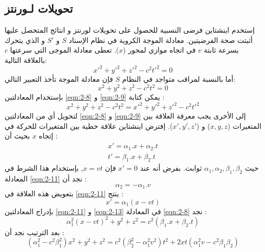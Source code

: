 \subsection{تحويلات لـورنتز}
إستخدم اينشتاين فرضى النسبية للحصول على تحويلات لورنتز و انتائج المتحصل عليها أثبتت صحة الفرضيتين. معادلة الموجة الكروية في نظام الإسناد $S$ و $S'$ و الذي يتحرك بسرعة ثابتة $v$ في اتجاه موازي لمحور ($x$). تعطى معادلة الموجى التي سرعتها $c$ بالعلاقة التالية:
 \begin{equation}
 	\label{eqn:2-8}
 	x'^{2} + y'^{2} + z'^{2} - c^{2}t'^{2}=0
 \end{equation}
 أما بالنسبة لمراقب متواجد في النظام  $S$ فإن معادلة الموجة تأخذ التعبير التالي:
  \begin{equation}
  	\label{eqn:2-9}
 	x^{2} + y^{2} + z^{2} - c^{2}t^{2}=0
 \end{equation}
بإستخدام المعادلتين  \eqref{eqn:2-8} و  \eqref{eqn:2-9}  يمكن كتابة :
 \begin{equation}
 	\label{eqn:2-10}
 	x^{2} + y^{2} + z^{2} - c^{2}t^{2}= x'^{2} + y'^{2} + z'^{2} - c^{2}t'^{2}
 \end{equation}
 لتحويل أي من المعادلتين  \eqref{eqn:2-8} و  \eqref{eqn:2-9}  إلى الأخرى يجب معرفة العلاقة بين المتغيرات ($x, y, z$) و ($x', y', z'$). إفترض اينشتاين علاقة خطية بين المتغيرات للحركة في إتجاه  $x$ بحيث أن : 
\begin{equation}
	\label{eqn:2-11}
	\begin{array}{ccl}
	x' = \alpha_{1}.x + \alpha_{2}.t \\
	t' = \beta_{1}.x + \beta_{2}.t	
\end{array}
 \end{equation}
 حيث $\alpha_{1}, \alpha_{2}, \beta_{1}, \beta_{2}$ ثوابت. 
بفرض أنه عند $x'=0$ فإن $x=vt$, بإستخدام هذا الشرط في المعادلة \eqref{eqn:2-11} نجد أن :
\begin{equation}
		\label{eqn:2-12}
	\alpha_{2} = - \alpha_{1}.v
\end{equation}
بتعويض هذه العلاقة في
\eqref{eqn:2-11} 
ينتج : 
\begin{equation}
	\label{eqn:2-13}
	x' = \alpha_{1} (x-vt)
\end{equation}
بإدراج المعادلتين 
\eqref{eqn:2-11} و \eqref{eqn:2-13} في المعادلة \eqref{eqn:2-8} نجد :
\begin{equation*}
\alpha_{1}^{2}(x-vt)^{2} + y^{2}+ z^{2} = c^{2}(\beta_{1}.x + \beta_{2}.t)
\end{equation*}
بعد الترتيب نجد أن :
\begin{equation}
	\label{eqn:2-14}
	(\alpha_{1}^{2}-c^{2}\beta_{1}^{2})x^{2} + y^{2}+ z^{2} = c^{2}(\beta_{2}^{2} -\alpha_{1}^{2}v^{2})t^{2} + 2xt(\alpha_{1}^{2}v-c^{2}\beta_{1}\beta_{2})
\end{equation}
